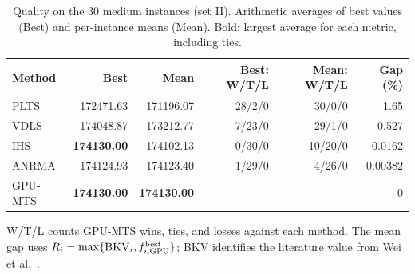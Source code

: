 \begin{table}[tbp]\centering\small
\caption{Quality on the 30 medium instances (set II). Arithmetic averages of best values (Best) and per-instance means (Mean). Bold: largest average for each metric, including ties.}
\label{tab:benchmark-medium}
\begin{tabular}{lrrrrr}
\toprule
Method & Best & Mean & Best: W/T/L & Mean: W/T/L & Gap (\%)\\
\midrule
PLTS & 172471.63 & 171196.07 & 28/2/0 & 30/0/0 & 1.65\\
VDLS & 174048.87 & 173212.77 & 7/23/0 & 29/1/0 & 0.527\\
IHS & \textbf{174130.00} & 174102.13 & 0/30/0 & 10/20/0 & 0.0162\\
ANRMA & 174124.93 & 174123.40 & 1/29/0 & 4/26/0 & 0.00382\\
GPU-MTS & \textbf{174130.00} & \textbf{174130.00} & -- & -- & 0\\
\bottomrule\end{tabular}
\par\smallskip\parbox{.97\linewidth}{\footnotesize W/T/L counts GPU-MTS wins, ties, and losses against each method. The mean gap uses $R_i=\max\{\mathrm{BKV}_i,f^{\mathrm{best}}_{i,\rm GPU}\}$; BKV identifies the literature value from Wei et al.~\cite{Wei2026ANRMA}.}
\end{table}
